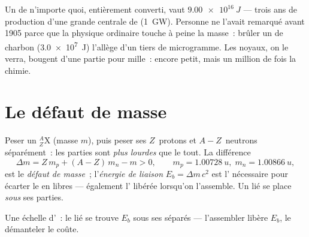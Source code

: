 \begin{example}\label{ex:g12:nuclear-energy:fortune}
Un  de n'importe quoi, entièrement converti,
vaut $\qty{9.00e16}{J}$ --- trois ans de production d'une grande
centrale de  (\qty{1}{GW}). Personne ne l'avait
remarqué avant 1905 parce que la physique ordinaire touche à peine la
masse~: brûler un  de charbon
(\qty{3.0e7}{J}) l'allège d'un tiers de microgramme. Les noyaux, on le
verra, bougent d'une partie pour mille~: encore petit, mais un million
de fois la chimie.
\end{example}

\section{Le défaut de masse}

\begin{definition}\label{def:g12:nuclear-energy:defect}
Peser un  ${}^{A}_{Z}\mathrm{X}$ (masse
$m$), puis peser ses $Z$~protons et $A - Z$~neutrons séparément~: les
parties sont \emph{plus lourdes} que le tout. La différence
\[
\Delta m = Z\,m_p + (A - Z)\,m_n - m > 0,
\qquad m_p = \qty{1.00728}{u},\; m_n = \qty{1.00866}{u},
\]
est le \emph{défaut de masse}~;
l'\emph{énergie de liaison}
$E_b = \Delta m\,c^2$ est l' nécessaire pour
écarter le  en
 libres --- également
l' libérée lorsqu'on l'assemble. Un
 lié se place \emph{sous} ses parties.
\end{definition}

\begin{omfigure}

{\small Une échelle d'~: le
 lié se trouve $E_b$ sous ses
 séparés --- l'assembler libère $E_b$,
le démanteler le coûte.}
\end{omfigure}

